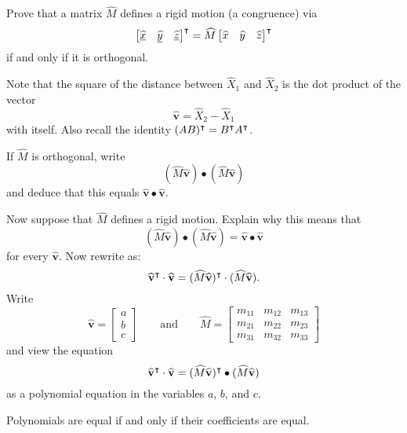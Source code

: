 \documentclass[newpage,hints,handout]{ximera}
\begin{document}
\begin{problem}
  Prove that a matrix $\hat{M}$ defines a rigid motion (a congruence)
  via
  \[
  \begin{bmatrix}
    \underline{\hat{x}} & \underline{\hat{y}} & \underline{\hat{z}}%
  \end{bmatrix}^\transpose
  =\hat M \begin{bmatrix} \hat{x} & \hat{y} & \hat{z}\end{bmatrix}^\transpose
  \]
  if and only if it is orthogonal.

  \begin{hint}
    Note that the square of the distance between $\hat{X}_{1}$ and
    $\hat{X}_{2}$ is the dot product of the vector%
    \[
    \hat{\mathbf v}=\hat{X}_{2}-\hat{X}_{1}%
    \]
    with itself.  Also recall the identity $(AB)^\intercal=B^\intercal A^\intercal$.
  \end{hint}
  \begin{hint}
    If $\hat{M}$ is orthogonal, write
    \[
    (\hat M\hat{\mathbf v}) \bullet (\hat M\hat{\mathbf v})
    \]
    and deduce that this equals $\hat{\mathbf v}\bullet\hat{\mathbf v}$. 
  \end{hint}
  \begin{hint}
    Now suppose that $\hat{M}$ defines a rigid motion. Explain why this means
    that
    \[
    (\hat{M}\hat{\mathbf v}) \bullet (\hat M\hat{\mathbf v})=
    \hat{\mathbf v} \bullet \hat{\mathbf v}
    \]
    for every $\hat{\mathbf v}$.  Now rewrite as:
    \[
    \widehat{\mathbf v}^\intercal \cdot\widehat{\mathbf v}
    =(\widehat{M}\widehat{\mathbf v})^\intercal \cdot (\widehat M\widehat{\mathbf v}).
    \]
    Write
    \[
    \hat{\mathbf v} =
    \begin{bmatrix}
      a \\ b \\ c
    \end{bmatrix}
    \qquad \text{and} \qquad
    \hat{M} =
    \begin{bmatrix}
      m_{11} & m_{12} & m_{13}\\
      m_{21} & m_{22} & m_{23}\\
      m_{31} & m_{32} & m_{33}
    \end{bmatrix}
    \]
    and view the equation 
    \[
    \widehat{\mathbf v}^\intercal \cdot\widehat{\mathbf v}
    =(\widehat{M}\widehat{\mathbf v})^\intercal \bullet (\widehat M\widehat{\mathbf v})
    \]
    as a polynomial equation in the variables $a$, $b$, and $c$. 
  \end{hint}
  \begin{hint}
    Polynomials are equal if and only if their coefficients are equal. 
  \end{hint}
  

\end{problem}
\end{document}
